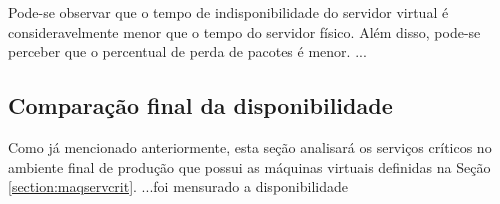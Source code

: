 Pode-se observar que o tempo de indisponibilidade do servidor virtual é consideravelmente menor que o tempo do servidor físico.
Além disso, pode-se perceber que o percentual de perda de pacotes é menor.
...

\subsection{Comparação final da disponibilidade}
\label{section:comparacaofinal}

Como já mencionado anteriormente, esta seção analisará os serviços críticos no ambiente final de produção que possui as máquinas virtuais
definidas na Seção \ref{section:maqservcrit}. 
...foi mensurado a disponibilidade



